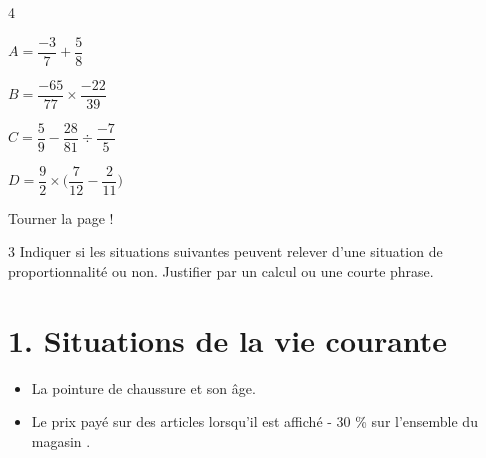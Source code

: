 \documentclass[a4paper]{book}
\begin{document}
{\begin{exerciceNote}{4}
        \medskip

        \begin{minipage}{0.24\linewidth}
            $A = \dfrac{-3}{7} + \dfrac{5}{8}$
            \vspace{7cm}
        \end{minipage}
        \hfill\vline\hfill
        \begin{minipage}{0.24\linewidth}
            $B = \dfrac{-65}{77}\times\dfrac{-22}{39}$
            \vspace{7cm}
        \end{minipage}        
        \hfill\vline\hfill
        \begin{minipage}{0.24\linewidth}
            $C = \dfrac{5}{9}-\dfrac{28}{81}\div\dfrac{-7}{5}$
            \vspace{7cm}
        \end{minipage}
        \hfill\vline\hfill
        \begin{minipage}{0.24\linewidth}
            $D = \dfrac{9}{2}\times\bigg(\dfrac{7}{12}-\dfrac{2}{11}\bigg)$
            \vspace{7cm}
        \end{minipage}     
    \end{exerciceNote}

\vfill
\hfill Tourner la page !

\newpage


    \begin{exerciceNote}{3}        
        Indiquer si les situations suivantes peuvent relever d'une situation de proportionnalité ou non. Justifier par un calcul ou une courte phrase.


        \section*{1. Situations de la vie courante}

        \begin{itemize}
            \item La pointure de chaussure et son âge. 

            \medskip
            \dotfill

            \item Le prix payé sur des articles lorsqu'il est affiché \og - 30 \% sur l'ensemble du magasin \fg. 

            \medskip
            \dotfill
        \end{itemize}


\end{exerciceNote}}
\end{document}
